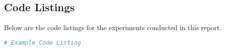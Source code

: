 \documentclass[10pt]{article}
\begin{document}
\subsection{Code Listings}

Below are the code listings for the experiments conducted in this report.

\lstset{language=julia}
\begin{lstlisting}[language=julia, caption={Algorithm 16.5}]
   # Example Code Listing
\end{lstlisting}
\newpage




\end{document}

